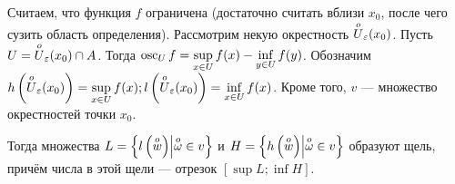 \documentclass[a4paper]{report}
\begin{document}
    Считаем, что функция $f$ ограничена (достаточно считать вблизи $x_0$, после чего сузить область определения).
    Рассмотрим некую окрестность $\overset{o}{U}_{\varepsilon}(x_0)$.
    Пусть $U = {\overset{o}{U}_{\varepsilon}(x_0)} \cap A$.
    Тогда $\operatorname{osc}_U f = \sup\limits_{x \in U}f(x) - \inf\limits_{y \in U}f(y)$.
    Обозначим $h\left(\overset{o}{U}_{\varepsilon}(x_0)\right) = \sup\limits_{x \in U}f(x); l\left(\overset{o}{U}_{\varepsilon}(x_0)\right) = \inf\limits_{x \in U}f(x)$.
    Кроме того, $v$ --- множество окрестностей точки $x_0$.

    Тогда множества $L = \left\{l\left(\overset{o}{w}\right)\middle|\overset{o}{\omega} \in v\right\}$ и $H = \left\{h\left(\overset{o}{w}\right)\middle|\overset{o}{\omega} \in v\right\}$ образуют щель, причём числа в этой щели --- отрезок $\left[\sup L; \inf H\right]$.
\end{document}
